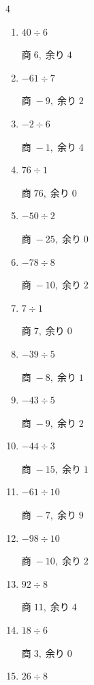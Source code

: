 \begin{multicols}{4}
\begin{enumerate}
        $商\; -4,\; 余り\; 3$

  \item $40 \div 6$

        $商\; 6,\; 余り\; 4$

  \item $-61 \div 7$

        $商\; -9,\; 余り\; 2$

  \item $-2 \div 6$

        $商\; -1,\; 余り\; 4$

  \item $76 \div 1$

        $商\; 76,\; 余り\; 0$

  \item $-50 \div 2$

        $商\; -25,\; 余り\; 0$

  \item $-78 \div 8$

        $商\; -10,\; 余り\; 2$

  \item $7 \div 1$

        $商\; 7,\; 余り\; 0$

\columnbreak %

  \item $-39 \div 5$

        $商\; -8,\; 余り\; 1$

  \item $-43 \div 5$

        $商\; -9,\; 余り\; 2$

  \item $-44 \div 3$

        $商\; -15,\; 余り\; 1$

  \item $-61 \div 10$

        $商\; -7,\; 余り\; 9$

  \item $-98 \div 10$

        $商\; -10,\; 余り\; 2$

  \item $92 \div 8$

        $商\; 11,\; 余り\; 4$

  \item $18 \div 6$

        $商\; 3,\; 余り\; 0$

  \item $26 \div 8$


\end{enumerate}
\end{multicols}

